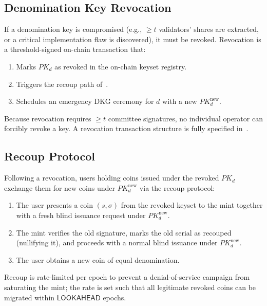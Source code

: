 \subsection{Denomination Key Revocation}
\label{sec:mint-revoke}

If a denomination key is compromised (e.g., $\geq t$ validators' shares are extracted, or a critical implementation flaw is discovered), it must be revoked. Revocation is a threshold-signed on-chain transaction that:

\begin{enumerate}[leftmargin=2em,itemsep=0pt]
  \item Marks $PK_d$ as revoked in the on-chain keyset registry.
  \item Triggers the recoup path of~.
  \item Schedules an emergency DKG ceremony for $d$ with a new $PK_d^{\text{new}}$.
\end{enumerate}

Because revocation requires $\geq t$ committee signatures, no individual operator can forcibly revoke a key. A revocation transaction structure is fully specified in~.

\subsection{Recoup Protocol}
\label{sec:mint-recoup}

Following a revocation, users holding coins issued under the revoked $PK_d$ exchange them for new coins under $PK_d^{\text{new}}$ via the recoup protocol:

\begin{enumerate}[leftmargin=2em,itemsep=0.2em]
  \item The user presents a coin $(s, \sigma)$ from the revoked keyset to the mint together with a fresh blind issuance request under $PK_d^{\text{new}}$.
  \item The mint verifies the old signature, marks the old serial as recouped (nullifying it), and proceeds with a normal blind issuance under $PK_d^{\text{new}}$.
  \item The user obtains a new coin of equal denomination.
\end{enumerate}

Recoup is rate-limited per epoch to prevent a denial-of-service campaign from saturating the mint; the rate is set such that all legitimate revoked coins can be migrated within $\mathsf{LOOKAHEAD}$ epochs.

